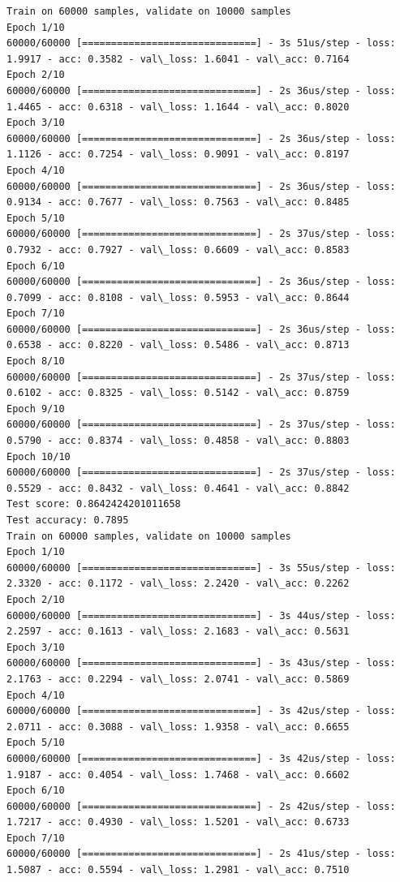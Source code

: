 \documentclass[11pt]{article}
\begin{document}
    \begin{Verbatim}[commandchars=\\\{\}]
Train on 60000 samples, validate on 10000 samples
Epoch 1/10
60000/60000 [==============================] - 3s 51us/step - loss: 1.9917 - acc: 0.3582 - val\_loss: 1.6041 - val\_acc: 0.7164
Epoch 2/10
60000/60000 [==============================] - 2s 36us/step - loss: 1.4465 - acc: 0.6318 - val\_loss: 1.1644 - val\_acc: 0.8020
Epoch 3/10
60000/60000 [==============================] - 2s 36us/step - loss: 1.1126 - acc: 0.7254 - val\_loss: 0.9091 - val\_acc: 0.8197
Epoch 4/10
60000/60000 [==============================] - 2s 36us/step - loss: 0.9134 - acc: 0.7677 - val\_loss: 0.7563 - val\_acc: 0.8485
Epoch 5/10
60000/60000 [==============================] - 2s 37us/step - loss: 0.7932 - acc: 0.7927 - val\_loss: 0.6609 - val\_acc: 0.8583
Epoch 6/10
60000/60000 [==============================] - 2s 36us/step - loss: 0.7099 - acc: 0.8108 - val\_loss: 0.5953 - val\_acc: 0.8644
Epoch 7/10
60000/60000 [==============================] - 2s 36us/step - loss: 0.6538 - acc: 0.8220 - val\_loss: 0.5486 - val\_acc: 0.8713
Epoch 8/10
60000/60000 [==============================] - 2s 37us/step - loss: 0.6102 - acc: 0.8325 - val\_loss: 0.5142 - val\_acc: 0.8759
Epoch 9/10
60000/60000 [==============================] - 2s 37us/step - loss: 0.5790 - acc: 0.8374 - val\_loss: 0.4858 - val\_acc: 0.8803
Epoch 10/10
60000/60000 [==============================] - 2s 37us/step - loss: 0.5529 - acc: 0.8432 - val\_loss: 0.4641 - val\_acc: 0.8842
Test score: 0.8642424201011658
Test accuracy: 0.7895
Train on 60000 samples, validate on 10000 samples
Epoch 1/10
60000/60000 [==============================] - 3s 55us/step - loss: 2.3320 - acc: 0.1172 - val\_loss: 2.2420 - val\_acc: 0.2262
Epoch 2/10
60000/60000 [==============================] - 3s 44us/step - loss: 2.2597 - acc: 0.1613 - val\_loss: 2.1683 - val\_acc: 0.5631
Epoch 3/10
60000/60000 [==============================] - 3s 43us/step - loss: 2.1763 - acc: 0.2294 - val\_loss: 2.0741 - val\_acc: 0.5869
Epoch 4/10
60000/60000 [==============================] - 3s 42us/step - loss: 2.0711 - acc: 0.3088 - val\_loss: 1.9358 - val\_acc: 0.6655
Epoch 5/10
60000/60000 [==============================] - 3s 42us/step - loss: 1.9187 - acc: 0.4054 - val\_loss: 1.7468 - val\_acc: 0.6602
Epoch 6/10
60000/60000 [==============================] - 2s 42us/step - loss: 1.7217 - acc: 0.4930 - val\_loss: 1.5201 - val\_acc: 0.6733
Epoch 7/10
60000/60000 [==============================] - 2s 41us/step - loss: 1.5087 - acc: 0.5594 - val\_loss: 1.2981 - val\_acc: 0.7510

\end{Verbatim}
\end{document}
